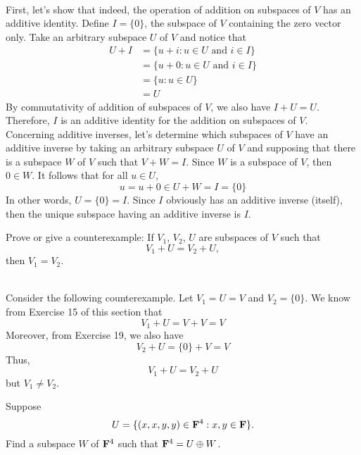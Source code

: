 \begin{solution}
    \\ First, let's show that indeed, the operation of addition on subspaces of $V$ has an additive identity. Define $I = \{0\}$, the subspace of $V$ containing the zero vector only. Take an arbitrary subspace $U$ of $V$ and notice that
    \begin{align*}
         U + I &= \{u+i: u\in U \text{ and } i \in I\} \\
         &= \{u+0 : u \in U \text{ and } i \in I\} \\
         &= \{u : u \in U\} \\
         &= U
    \end{align*}
    By commutativity of addition of subspaces of $V$, we also have $I + U = U$. Therefore, $I$ is an additive identity for the addition on subspaces of $V$. \\
    Concerning additive inverses, let's determine which subspaces of $V$ have an additive inverse by taking an arbitrary subspace $U$ of $V$ and supposing that there is a subspace $W$ of $V$ such that $V + W = I$. Since $W$ is a subspace of $V$, then $0 \in W$. It follows that for all $u \in U$, 
    $$u  = u + 0 \in U+W = I = \{0\}$$
    In other words, $U = \{0\} = I$. Since $I$ obviously has an additive inverse (itself), then the unique subspace having an additive inverse is $I$. \\
\end{solution}

\begin{exercise}
    Prove or give a counterexample: If $V_1$, $V_2$, $U$ are subspaces of $V$ such that
    $$V_1 + U = V_2 + U,$$
    then $V_1 = V_2$.\\
\end{exercise}

\begin{solution}
    \\ Consider the following counterexample. Let $V_1 = U =V$ and $V_2 = \{0\}$. We know from Exercise 15 of this section that
    $$V_1 + U = V + V = V$$
    Moreover, from Exercise 19, we also have
    $$V_2 + U = \{0\} + V = V$$
    Thus,
    $$V_1 + U = V_2 + U$$
    but $V_1 \neq V_2$. \\
\end{solution}

\begin{exercise}
    Suppose 
    $$U = \{(x,x,y,y) \in \mathbf{F}^4 : x,y \in \mathbf{F}\}.$$
    Find a subspace $W$ of $\mathbf{F}^4$ such that $\mathbf{F}^4 = U \oplus W$. \\
\end{exercise}

